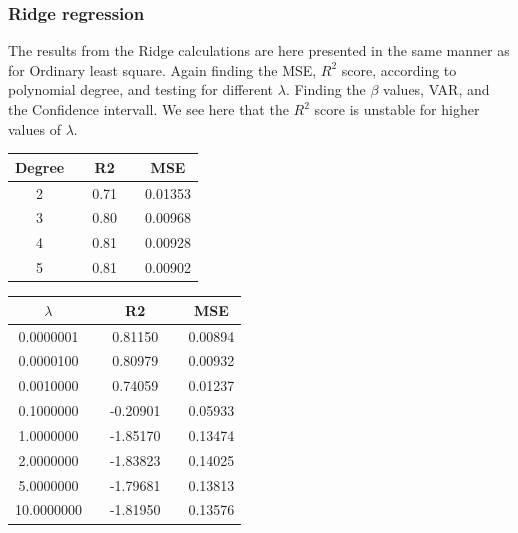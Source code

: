   \pagebreak
  
\subsubsection{Ridge regression}
The results from the Ridge calculations are here presented in the same manner as for Ordinary least square. Again finding the MSE, $R^2$ score, according to polynomial degree, and testing for different $\lambda$. Finding the $\beta$ values, VAR, and the Confidence intervall. We see here that the $R^2$ score is unstable for higher values of $\lambda$.
 

 \begin{center}
 \label{tab:Ridge_Degree_R2_MSE}
 \begin{tabularx}{\textwidth}{c X c X c  }
     \hline
     \hline
         Degree && R2 && MSE \\
         \hline
2      && 0.71 && 0.01353 \\ 
3      && 0.80 && 0.00968 \\ 
4      && 0.81 && 0.00928 \\ 
5      && 0.81 && 0.00902 \\ \hline
 \end{tabularx}
 \end{center}
 
 
\begin{center}
 \label{tab:OLS_lambda_R2_MSE}
 \begin{tabularx}{\textwidth}{c X c X c  }
     \hline
     \hline
         $\lambda$ && R2 && MSE \\
         \hline
 0.0000001  && 0.81150  && 0.00894 \\
0.0000100  && 0.80979  && 0.00932 \\
0.0010000  && 0.74059  && 0.01237 \\
0.1000000  && -0.20901 && 0.05933 \\
1.0000000  && -1.85170 && 0.13474 \\
2.0000000  && -1.83823 && 0.14025 \\
5.0000000  && -1.79681 && 0.13813 \\
10.0000000 && -1.81950 && 0.13576\\ \hline
 \end{tabularx}
 \end{center}

